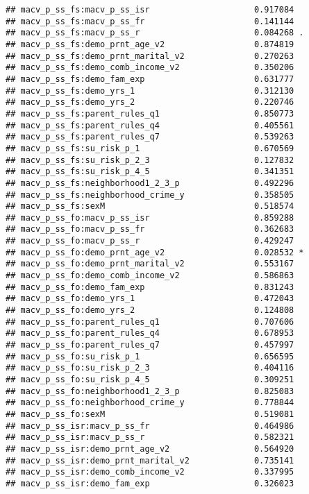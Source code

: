 \documentclass[
]{article}
\begin{document}
\begin{verbatim}
## macv_p_ss_fs:macv_p_ss_isr                     0.917084    
## macv_p_ss_fs:macv_p_ss_fr                      0.141144    
## macv_p_ss_fs:macv_p_ss_r                       0.084268 .  
## macv_p_ss_fs:demo_prnt_age_v2                  0.874819    
## macv_p_ss_fs:demo_prnt_marital_v2              0.270263    
## macv_p_ss_fs:demo_comb_income_v2               0.350206    
## macv_p_ss_fs:demo_fam_exp                      0.631777    
## macv_p_ss_fs:demo_yrs_1                        0.312130    
## macv_p_ss_fs:demo_yrs_2                        0.220746    
## macv_p_ss_fs:parent_rules_q1                   0.850773    
## macv_p_ss_fs:parent_rules_q4                   0.405561    
## macv_p_ss_fs:parent_rules_q7                   0.539263    
## macv_p_ss_fs:su_risk_p_1                       0.670569    
## macv_p_ss_fs:su_risk_p_2_3                     0.127832    
## macv_p_ss_fs:su_risk_p_4_5                     0.341351    
## macv_p_ss_fs:neighborhood1_2_3_p               0.492296    
## macv_p_ss_fs:neighborhood_crime_y              0.358505    
## macv_p_ss_fs:sexM                              0.518574    
## macv_p_ss_fo:macv_p_ss_isr                     0.859288    
## macv_p_ss_fo:macv_p_ss_fr                      0.362683    
## macv_p_ss_fo:macv_p_ss_r                       0.429247    
## macv_p_ss_fo:demo_prnt_age_v2                  0.028532 *  
## macv_p_ss_fo:demo_prnt_marital_v2              0.553167    
## macv_p_ss_fo:demo_comb_income_v2               0.586863    
## macv_p_ss_fo:demo_fam_exp                      0.831243    
## macv_p_ss_fo:demo_yrs_1                        0.472043    
## macv_p_ss_fo:demo_yrs_2                        0.124808    
## macv_p_ss_fo:parent_rules_q1                   0.707606    
## macv_p_ss_fo:parent_rules_q4                   0.678953    
## macv_p_ss_fo:parent_rules_q7                   0.457997    
## macv_p_ss_fo:su_risk_p_1                       0.656595    
## macv_p_ss_fo:su_risk_p_2_3                     0.404116    
## macv_p_ss_fo:su_risk_p_4_5                     0.309251    
## macv_p_ss_fo:neighborhood1_2_3_p               0.825083    
## macv_p_ss_fo:neighborhood_crime_y              0.778844    
## macv_p_ss_fo:sexM                              0.519081    
## macv_p_ss_isr:macv_p_ss_fr                     0.464986    
## macv_p_ss_isr:macv_p_ss_r                      0.582321    
## macv_p_ss_isr:demo_prnt_age_v2                 0.564920    
## macv_p_ss_isr:demo_prnt_marital_v2             0.735141    
## macv_p_ss_isr:demo_comb_income_v2              0.337995    
## macv_p_ss_isr:demo_fam_exp                     0.326023    

\end{verbatim}
\end{document}
